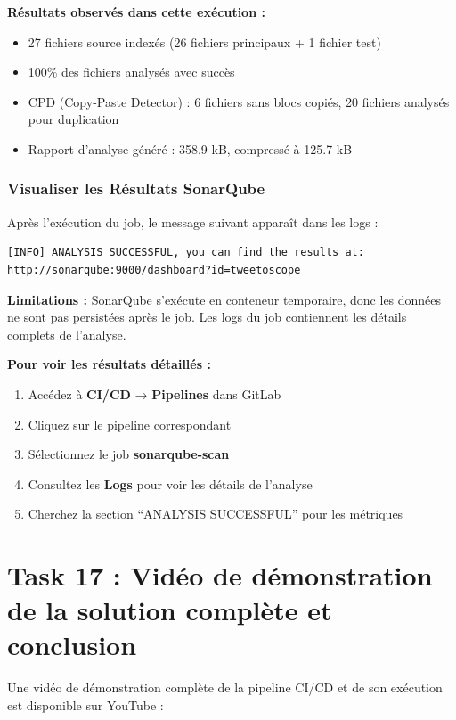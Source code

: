 \documentclass[10pt,a4paper]{article}
\begin{document}
\textbf{Résultats observés dans cette exécution :}

\begin{itemize}
    \item 27 fichiers source indexés (26 fichiers principaux + 1 fichier test)
    \item 100\% des fichiers analysés avec succès
    \item CPD (Copy-Paste Detector) : 6 fichiers sans blocs copiés, 20 fichiers analysés pour duplication
    \item Rapport d'analyse généré : 358.9 kB, compressé à 125.7 kB
\end{itemize}

\subsubsection{Visualiser les Résultats SonarQube}

Après l'exécution du job, le message suivant apparaît dans les logs :

\begin{verbatim}
[INFO] ANALYSIS SUCCESSFUL, you can find the results at:
http://sonarqube:9000/dashboard?id=tweetoscope
\end{verbatim}

\textbf{Limitations :} SonarQube s'exécute en conteneur temporaire, donc les données ne sont pas persistées après le job. Les logs du job contiennent les détails complets de l'analyse.

\textbf{Pour voir les résultats détaillés :}

\begin{enumerate}
    \item Accédez à \textbf{CI/CD} → \textbf{Pipelines} dans GitLab
    \item Cliquez sur le pipeline correspondant
    \item Sélectionnez le job \textbf{sonarqube-scan}
    \item Consultez les \textbf{Logs} pour voir les détails de l'analyse
    \item Cherchez la section ``ANALYSIS SUCCESSFUL'' pour les métriques
\end{enumerate}


\section{Task 17 : Vidéo de démonstration de la solution complète et conclusion}

Une vidéo de démonstration complète de la pipeline CI/CD et de son exécution est disponible sur YouTube :
\end{document}
